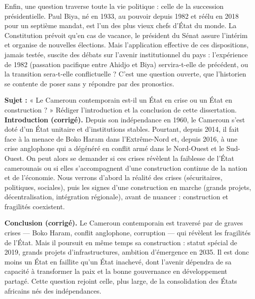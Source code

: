 \documentclass[11pt]{article}
\newcommand{\cle}[1]{{\popxbold\color{popdark}#1}}
\begin{document}
Enfin, une question traverse toute la vie politique : celle de la \cle{succession présidentielle}. Paul Biya, né en 1933, au pouvoir depuis 1982 et réélu en 2018 pour un septième mandat, est l'un des plus vieux chefs d'État du monde. La Constitution prévoit qu'en cas de vacance, le président du Sénat assure l'intérim et organise de nouvelles élections. Mais l'application effective de ces dispositions, jamais testée, suscite des débats sur l'\cle{avenir institutionnel} du pays : l'expérience de 1982 (passation pacifique entre Ahidjo et Biya) servira-t-elle de précédent, ou la transition sera-t-elle conflictuelle ? C'est une question ouverte, que l'historien se contente de poser sans y répondre par des pronostics.

\begin{exoresolu}
\textbf{Sujet :} « Le Cameroun contemporain est-il un État en crise ou un État en construction ? » Rédiger l'introduction et la conclusion de cette dissertation.
\tcblower
\textbf{Introduction (corrigé).} Depuis son indépendance en 1960, le Cameroun s'est doté d'un État unitaire et d'institutions stables. Pourtant, depuis 2014, il fait face à la menace de Boko Haram dans l'Extrême-Nord et, depuis 2016, à une crise anglophone qui a dégénéré en conflit armé dans le Nord-Ouest et le Sud-Ouest. On peut alors se demander si ces crises révèlent la faiblesse de l'État camerounais ou si elles s'accompagnent d'une construction continue de la nation et de l'économie. Nous verrons d'abord la réalité des crises (sécuritaires, politiques, sociales), puis les signes d'une construction en marche (grands projets, décentralisation, intégration régionale), avant de nuancer : construction et fragilités coexistent.

\textbf{Conclusion (corrigé).} Le Cameroun contemporain est traversé par de graves crises — Boko Haram, conflit anglophone, corruption — qui révèlent les fragilités de l'État. Mais il poursuit en même temps sa construction : statut spécial de 2019, grands projets d'infrastructures, ambition d'émergence en 2035. Il est donc moins un État en faillite qu'un État inachevé, dont l'avenir dépendra de sa capacité à transformer la paix et la bonne gouvernance en développement partagé. Cette question rejoint celle, plus large, de la consolidation des États africains nés des indépendances.
\end{exoresolu}
\end{document}
